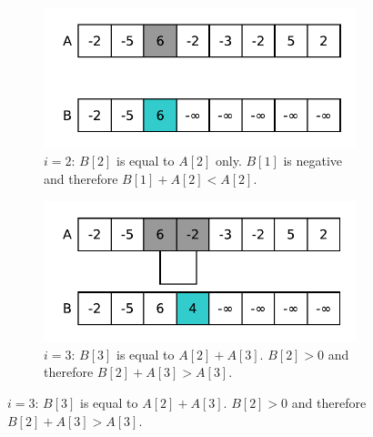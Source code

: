 \begin{figure}
	\begin{subfigure}[t]{0.48\textwidth}
		\centering
		\includegraphics[width=\textwidth]{sources/max_sum_continguous_subarray/images/kadane3}
		\caption{$i=2$: $B[2]$ is equal to $A[2]$ only. $B[1]$ is negative and therefore $B[1]+A[2] < A[2]$.}
		\label{fig:median_sorted_array:kadane2}
	\end{subfigure}
	\hfill
	\begin{subfigure}[t]{0.48\textwidth}
		\centering
		\includegraphics[width=\textwidth]{sources/max_sum_continguous_subarray/images/kadane4}
		\caption{$i=3$: $B[3]$ is equal to $A[2]+A[3]$. $B[2] > 0$ and therefore $B[2]+A[3] > A[3]$.}
		\label{fig:median_sorted_array:kadane3}
	\end{subfigure}
	\hfill


\end{figure}
